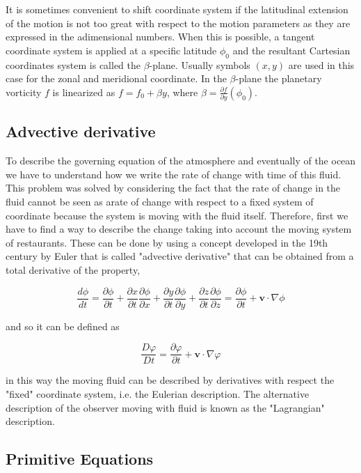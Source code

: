 It is sometimes convenient to shift coordinate system if the latitudinal
extension of the motion is not too great with respect to the motion
parameters as they are expressed in the adimensional numbers. When this
is possible, a tangent coordinate system is applied at a specific
latitude \(\phi_0\) and the resultant Cartesian coordinates system is
called the \(\beta\)-plane. Usually symbols \((x,y)\) are used in this
case for the zonal and meridional coordinate. In the \(\beta\)-plane the
planetary vorticity \(f\) is linearized as \(f=f_0 + \beta y\), where
\(\beta = \frac{\partial f}{\partial y}({\phi_0})\).

\subsection{Advective derivative}\label{Sec:Adv}

To describe the governing equation of the atmosphere and eventually of
the ocean we have to understand how we write the rate of change with
time of this fluid. This problem was solved by considering the fact that
the rate of change in the fluid cannot be seen as arate of change with
respect to a fixed system of coordinate because the system is moving
with the fluid itself. Therefore, first we have to find a way to
describe the change taking into account the moving system of
restaurants. These can be done by using a concept developed in the 19th
century by Euler that is called "advective derivative" that can be
obtained from a total derivative of the property,

\[\frac{d \phi}{dt} = \frac{\partial \phi}{\partial t} + \frac{\partial x}{\partial t}\frac{\partial \phi}{\partial x} + \frac{\partial y}{\partial t}\frac{\partial \phi}{\partial y}+\frac{\partial z}{\partial t}\frac{\partial \phi}{\partial z} = \frac{\partial \phi}{\partial t} + \mathbf{v}\cdot\nabla\phi\]

and so it can be defined as

\[\frac{D \varphi}{Dt} =\frac{\partial \varphi}{\partial t} + \mathbf{v}\cdot\nabla\varphi\]

in this way the moving fluid can be described by derivatives with
respect the "fixed" coordinate system, i.e. the Eulerian description.
The alternative description of the observer moving with fluid is known
as the "Lagrangian" description.

\subsection{Primitive Equations}\label{Sec:Prim}

